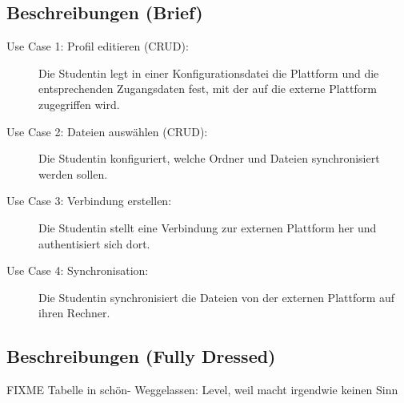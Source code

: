 \documentclass[a4paper]{article}
\begin{document}
\subsection{Beschreibungen (Brief)}
\begin{description}
	
\item[Use Case 1: Profil editieren (CRUD):] Die Studentin legt in einer Konfigurationsdatei die Plattform und die entsprechenden Zugangsdaten fest, mit der auf die externe Plattform zugegriffen wird.

\item[Use Case 2: Dateien auswählen (CRUD):] Die Studentin konfiguriert, welche Ordner und Dateien synchronisiert werden sollen.

\item[Use Case 3: Verbindung erstellen:] Die Studentin stellt eine Verbindung zur externen Plattform her und authentisiert sich dort.

\item[Use Case 4: Synchronisation:] Die Studentin synchronisiert die Dateien von der externen Plattform auf ihren Rechner.
\end{description}

\pagebreak
\subsection{Beschreibungen (Fully Dressed)}

FIXME Tabelle in schön- Weggelassen: Level, weil macht irgendwie keinen Sinn
\end{document}
